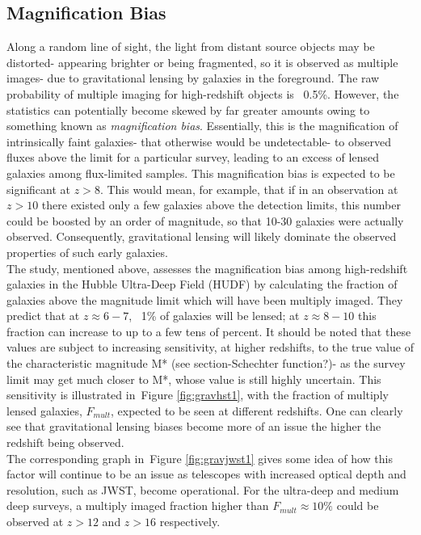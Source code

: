 \documentclass [a4paper, 12pt] {article}
\begin{document}
\subsection{Magnification Bias}
Along a random line of sight, the light from distant source objects may be distorted- appearing brighter or being fragmented, so it is observed as multiple images- due to gravitational lensing by galaxies in the foreground. The raw probability of multiple imaging for high-redshift objects is ~0.5\%. However, the statistics can potentially become skewed by far greater amounts owing to something known as \emph{magnification bias}. Essentially, this is the magnification of intrinsically faint galaxies- that otherwise would be undetectable- to observed fluxes above the limit for a particular survey, leading to an excess of lensed galaxies among flux-limited samples. This magnification bias is expected to be significant at $z>8$. This would mean, for example, that if in an observation at $z>10$ there existed only a few galaxies above the detection limits, this number could be boosted by an order of magnitude, so that 10-30 galaxies were actually observed\cite{Cosmicmagnifyinglenses}. Consequently, gravitational lensing will likely dominate the observed properties of such early galaxies.
\\
\newline
The study, mentioned above, assesses the magnification bias among high-redshift galaxies in the Hubble Ultra-Deep Field (HUDF) by calculating the fraction of galaxies above the magnitude limit which will have been multiply imaged. They predict that at $z\approx6-7$, ~1\% of galaxies will be lensed; at $z\approx8-10$ this fraction can increase to up to a few tens of percent\cite{wyithestuart2011}. It should be noted that these values are subject to increasing sensitivity, at higher redshifts, to the true value of the characteristic magnitude M* (see section-Schechter function?)- as the survey limit may get much closer to M*, whose value is still highly uncertain. This sensitivity is illustrated in~Figure \ref{fig:gravhst1}, with the fraction of multiply lensed galaxies, $F_{mult}$, expected to be seen at different redshifts. One can clearly see that gravitational lensing biases become more of an issue the higher the redshift being observed.
\\
\newline
The corresponding graph in~Figure \ref{fig:gravjwst1} gives some idea of how this factor will continue to be an issue as telescopes with increased optical depth and resolution, such as JWST, become operational. For the ultra-deep and medium deep surveys, a multiply imaged fraction higher than $F_{mult}\approx10\%$ could be observed at $z>12$ and $z>16$ respectively.
\end{document}
